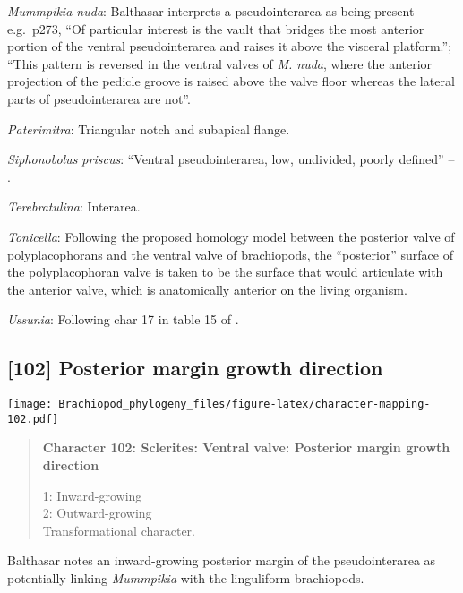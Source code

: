 \documentclass[openany]{book}
\theoremstyle{definition}
\theoremstyle{definition}
\theoremstyle{definition}
\theoremstyle{remark}
\begin{document}
\hypertarget{Mummpikia_nuda-coding-101}{}
\emph{Mummpikia nuda}: Balthasar \citeyearpar{Balthasar2008iMummpikia}
interprets a pseudointerarea as being present -- e.g.~p273, ``Of
particular interest is the vault that bridges the most anterior portion
of the ventral pseudointerarea and raises it above the visceral
platform.''; ``This pattern is reversed in the ventral valves of
\emph{M. nuda}, where the anterior projection of the pedicle groove is
raised above the valve floor whereas the lateral parts of
pseudointerarea are not''.

\hypertarget{Paterimitra-coding-101}{}
\emph{Paterimitra}: Triangular notch and subapical flange.

\hypertarget{Siphonobolus_priscus-coding-101}{}
\emph{Siphonobolus priscus}: ``Ventral pseudointerarea, low, undivided,
poorly defined'' -- \citet{Williams2000LinguliformeaCraniiformea}.

\hypertarget{Terebratulina-coding-101}{}
\emph{Terebratulina}: Interarea.

\hypertarget{Tonicella-coding-101}{}
\emph{Tonicella}: Following the proposed homology model between the
posterior valve of polyplacophorans and the ventral valve of
brachiopods, the ``posterior'' surface of the polyplacophoran valve is
taken to be the surface that would articulate with the anterior valve,
which is anatomically anterior on the living organism.

\hypertarget{Ussunia-coding-101}{}
\emph{Ussunia}: Following char 17 in table 15 of
\citet{Williams2000LinguliformeaCraniiformea}.

\subsection*{{[}102{]} Posterior margin growth
direction}\label{posterior-margin-growth-direction}

\texttt{[image: Brachiopod\_phylogeny\_files/figure-latex/character-mapping-102.pdf]}

\begin{quote}
\textbf{Character 102: Sclerites: Ventral valve: Posterior margin growth
direction}

1: Inward-growing\\
2: Outward-growing\\
Transformational character.
\end{quote}

Balthasar \citeyearpar{Balthasar2008iMummpikia} notes an inward-growing
posterior margin of the pseudointerarea as potentially linking
\emph{Mummpikia} with the linguliform brachiopods.
\end{document}
